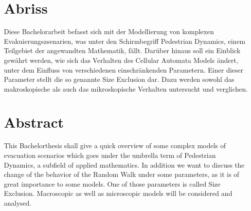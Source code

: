 \section*{Abriss}
Diese Bachelorarbeit befasst sich mit der Modellierung von komplexen Evakuierungszsenarien,
was unter den Schirmbegriff Pedestrian Dynamics, einem Teilgebiet der angewandten Mathematik, fällt.
Darüber hinaus soll ein Einblick gewährt werden, wie sich das Verhalten des Cellular Automata Models ändert, 
unter dem Einfluss von verschiedenen einschränkenden Parametern. Einer dieser Parameter stellt die so genannte Size Exclusion dar. 
Dazu werden sowohl das makroskopische als auch das mikroskopische Verhalten untersucht und verglichen. 

\vspace{1.5cm}
\section*{Abstract}
This Bachelorthesis shall give a quick overview of some complex models of evacuation scenarios
which goes under the umbrella term of Pedestrian Dynamics, a subfield of applied mathematics. 
In addition we want to discuss the change of the behavior of the Random Walk under some parameters, 
as it is of great importance to some models. One of those parameters is called Size Exclusion. 
Macroscopic as well as microscopic models will be considered and analysed. 
